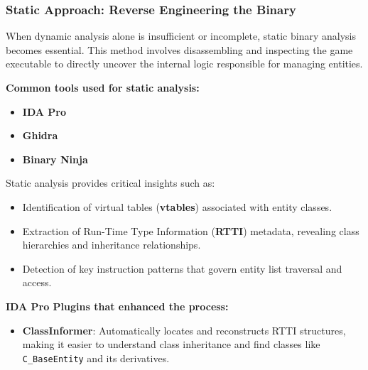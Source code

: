 \begin{tcolorbox}[colback=gray!03, colframe=black!15, sharp corners, boxrule=0.3mm, width=\textwidth]

    \subsubsection*{Static Approach: Reverse Engineering the Binary}
    
    When dynamic analysis alone is insufficient or incomplete, static binary analysis becomes essential. This method involves disassembling and inspecting the game executable to directly uncover the internal logic responsible for managing entities.
    
    \vspace{0.4cm}
    
    \textbf{Common tools used for static analysis:}
    
    \begin{itemize}
        \item \textbf{IDA Pro}
        \item \textbf{Ghidra}
        \item \textbf{Binary Ninja}
    \end{itemize}
    
    \vspace{0.2cm}
    
    Static analysis provides critical insights such as:
    
    \begin{itemize}
        \item Identification of virtual tables (\textbf{vtables}) associated with entity classes.
        \item Extraction of Run-Time Type Information (\textbf{RTTI}) metadata, revealing class hierarchies and inheritance relationships.
        \item Detection of key instruction patterns that govern entity list traversal and access.
    \end{itemize}
    
    \vspace{0.2cm}
    
    \textbf{IDA Pro Plugins that enhanced the process:}
    
    \begin{itemize}
        \item \textbf{ClassInformer}:  
        Automatically locates and reconstructs RTTI structures, making it easier to understand class inheritance and find classes like \texttt{C\_BaseEntity} and its derivatives.
    

\end{itemize}
\end{tcolorbox}
